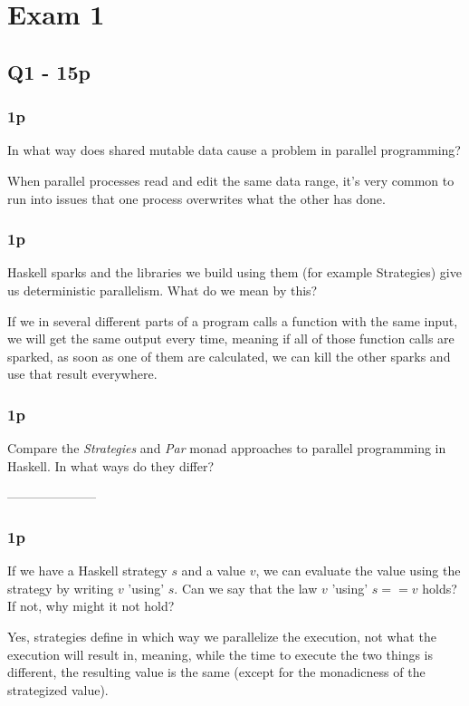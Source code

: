 \chapter{Exam 1}
\section{Q1 - 15p}
\renewcommand{\thesubsection}{\alph{subsection}}
\subsection{1p}
In what way does shared mutable data cause a problem in parallel programming?

When parallel processes read and edit the same data range, it's very common to run into issues that one process overwrites what the other has done.

\subsection{1p}
Haskell sparks and the libraries we build using them (for example Strategies) give us deterministic parallelism. What do we mean by this?

If we in several different parts of a program calls a function with the same input, we will get the same output every time, meaning if all of those function calls are sparked, as soon as one of them are calculated, we can kill the other sparks and use that result everywhere.

\subsection{1p}
Compare the \textit{Strategies} and \textit{Par} monad approaches to parallel programming in Haskell. In what ways do they differ?

---------------------

\subsection{1p}
If we have a Haskell strategy $s$ and a value $v$, we can evaluate the value using the strategy by writing $v$ 'using' $s$. Can we say that the law $v$ 'using' $s == v$ holds? If not, why might it not hold?


Yes, strategies define in which way we parallelize the execution, not what the execution will result in, meaning, while the time to execute the two things is different, the resulting value is the same (except for the monadicness of the strategized value).


